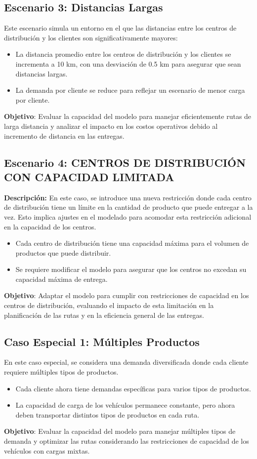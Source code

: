 \documentclass[12pt]{article}
\begin{document}
\subsection{Escenario 3: Distancias Largas}
Este escenario simula un entorno en el que las distancias entre los centros de distribución y los clientes son significativamente mayores:
\begin{itemize}
    \item La distancia promedio entre los centros de distribución y los clientes se incrementa a 10 km, con una desviación de 0.5 km para asegurar que sean distancias largas.
    \item La demanda por cliente se reduce para reflejar un escenario de menor carga por cliente.
\end{itemize}
\textbf{Objetivo}: Evaluar la capacidad del modelo para manejar eficientemente rutas de larga distancia y analizar el impacto en los costos operativos debido al incremento de distancia en las entregas.

\subsection{Escenario 4: \textbf{CENTROS DE DISTRIBUCIÓN CON CAPACIDAD LIMITADA}}
\textbf{Descripción:} En este caso, se introduce una nueva restricción donde cada centro de distribución tiene un límite en la cantidad de producto que puede entregar a la vez. Esto implica ajustes en el modelado para acomodar esta restricción adicional en la capacidad de los centros.
\begin{itemize}
    \item Cada centro de distribución tiene una capacidad máxima para el volumen de productos que puede distribuir.
    \item Se requiere modificar el modelo para asegurar que los centros no excedan su capacidad máxima de entrega.
\end{itemize}
\textbf{Objetivo}: Adaptar el modelo para cumplir con restricciones de capacidad en los centros de distribución, evaluando el impacto de esta limitación en la planificación de las rutas y en la eficiencia general de las entregas.

\subsection{Caso Especial 1: Múltiples Productos}
En este caso especial, se considera una demanda diversificada donde cada cliente requiere múltiples tipos de productos.
\begin{itemize}
    \item Cada cliente ahora tiene demandas específicas para varios tipos de productos.
    \item La capacidad de carga de los vehículos permanece constante, pero ahora deben transportar distintos tipos de productos en cada ruta.
\end{itemize}
\textbf{Objetivo}: Evaluar la capacidad del modelo para manejar múltiples tipos de demanda y optimizar las rutas considerando las restricciones de capacidad de los vehículos con cargas mixtas.
\end{document}
